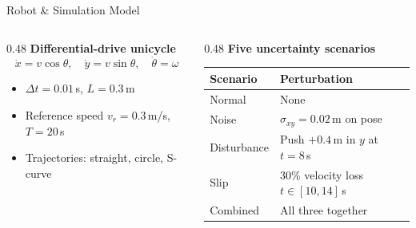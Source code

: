 \documentclass[aspectratio=169,11pt]{beamer}
\begin{document}
\begin{frame}{Robot \& Simulation Model}
  \begin{columns}[T]
    \begin{column}{0.48\textwidth}
      \textbf{Differential-drive unicycle}
      \begin{equation*}
        \dot{x} = v\cos\theta,\quad \dot{y} = v\sin\theta,\quad \dot{\theta} = \omega
      \end{equation*}
      \begin{itemize}
        \item $\Delta t = 0.01$\,s, $L = 0.3$\,m
        \item Reference speed $v_r = 0.3$\,m/s, $T = 20$\,s
        \item Trajectories: straight, circle, S-curve
      \end{itemize}
    \end{column}
    \begin{column}{0.48\textwidth}
      \textbf{Five uncertainty scenarios}
      \begin{table}
        \small
        \begin{tabular}{@{}ll@{}}
          \toprule
          Scenario & Perturbation \\
          \midrule
          Normal & None \\
          Noise & $\sigma_{xy}=0.02$\,m on pose \\
          Disturbance & Push $+0.4$\,m in $y$ at $t=8$\,s \\
          Slip & 30\% velocity loss $t\in[10,14]$\,s \\
          Combined & All three together \\
          \bottomrule
        \end{tabular}
      \end{table}
    \end{column}
  \end{columns}
\end{frame}
\end{document}

